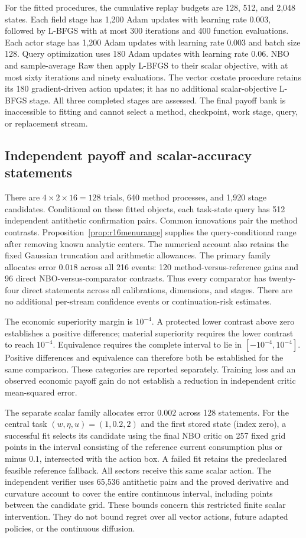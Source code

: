 For the fitted procedures, the cumulative replay budgets are 128, 512, and
2,048 states. Each field stage has 1,200 Adam updates with learning rate
$0.003$, followed by L-BFGS with at most 300 iterations and 400 function
evaluations. Each actor stage has 1,200 Adam updates with learning rate
$0.003$ and batch size 128. Query optimization uses 180 Adam updates with
learning rate $0.06$. NBO and sample-average Raw then apply L-BFGS to their
scalar objective, with at most sixty iterations and ninety evaluations. The
vector costate procedure retains its 180 gradient-driven action updates;
it has no additional scalar-objective L-BFGS stage. All three completed
stages are assessed. The final payoff bank is inaccessible to fitting and
cannot select a method, checkpoint, work stage, query, or replacement stream.

\subsection{Independent payoff and scalar-accuracy statements}
There are $4\times2\times16=128$ trials, 640 method processes, and 1,920
stage candidates. Conditional on these fitted objects, each task-state query
has 512 independent antithetic confirmation pairs. Common innovations pair
the method contrasts. Proposition~\ref{prop:r16menurange} supplies the
query-conditional range after removing known analytic centers. The numerical
account also retains the fixed Gaussian truncation and arithmetic
allowances. The primary family allocates error $0.018$ across all 216 events:
120 method-versus-reference gains and 96 direct NBO-versus-comparator
contrasts. Thus every comparator has twenty-four direct statements across
all calibrations, dimensions, and stages. There are no additional per-stream
confidence events or continuation-risk estimates.

The economic superiority margin is $10^{-4}$. A protected lower contrast
above zero establishes a positive difference; material superiority requires
the lower contrast to reach $10^{-4}$. Equivalence requires the complete
interval to lie in $[-10^{-4},10^{-4}]$. Positive differences and equivalence
can therefore both be established for the same comparison. These categories
are reported separately. Training loss and an observed economic payoff gain
do not establish a reduction in independent critic mean-squared error.

The separate scalar family allocates error $0.002$ across 128 statements.
For the central task $(w,\eta,u)=(1,0.2,2)$ and the first stored state
(index zero), a successful fit selects its
candidate using the final NBO critic on 257 fixed grid points
in the interval consisting of the reference current consumption plus or
minus $0.1$, intersected with the action box. A failed fit retains the
predeclared feasible reference fallback. All sectors receive this same
scalar action. The independent verifier uses 65,536 antithetic pairs and the
proved derivative and curvature account to cover the entire continuous
interval, including points between the candidate grid. These bounds concern
this restricted finite scalar intervention. They do not bound regret over
all vector actions, future adapted policies, or the continuous diffusion.

